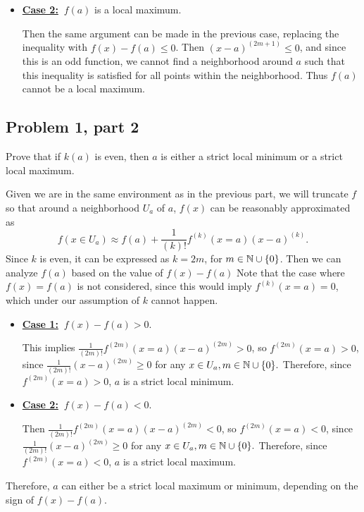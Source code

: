 \begin{solution}
\begin{itemize}[-]
        \item \underline{\textbf{Case 2:}} $ \ f(a)$ is a local maximum.

        \hop
        Then the same argument can be made in the previous case, replacing the inequality with $f(x) - f(a) \leq 0$. Then $(x - a)^{(2m+1)} \leq 0$, and since this is an odd function, we cannot find a neighborhood around $a$ such that this inequality is satisfied for all points within the neighborhood. Thus $f(a)$ cannot be a local maximum.
    \end{itemize}
\end{solution}

\newpage
\subsection{Problem 1, part 2}
Prove that if $k(a)$ is even, then $a$ is either a strict local minimum or a strict local maximum.  
\partbreak
\begin{solution}

    Given we are in the same environment as in the previous part, we will truncate $f$ so that around a neighborhood $U_a$ of $a$, $f(x)$ can be reasonably approximated as 
    \[f(x \in U_a) \approx f(a) + \frac{1}{(k)!}f^{(k)}(x = a) (x - a)^{(k)}.\]
    Since $k$ is even, it can be expressed as $k = 2m$, for $m \in \mathbb{N} \cup \{0\}$. Then we can analyze $f(a)$ based on the value of $f(x) - f(a)$ Note that the case where $f(x) = f(a)$ is not considered, since this would imply $f^{(k)}(x = a) = 0$, which under our assumption of $k$ cannot happen.

    \begin{itemize}[-]
        \item \underline{\textbf{Case 1:}} $ \ f(x) - f(a) > 0 $. 

        \hop
         This implies $\frac{1}{(2m)!}f^{(2m)}(x = a) (x - a)^{(2m)} > 0$, so $f^{(2m)}(x = a) > 0$, since $\frac{1}{(2m)!}(x - a)^{(2m)} \geq 0$ for any $x \in U_a, m \in \mathbb{N} \cup \{0\}.$ Therefore, since $f^{(2m)}(x = a) > 0$, $a$ is a strict local minimum. 

         \item \underline{\textbf{Case 2:}} $ \ f(x) - f(a) < 0$.

         \hop
         Then $\frac{1}{(2m)!}f^{(2m)}(x = a) (x - a)^{(2m)} < 0$, so $f^{(2m)}(x = a) < 0$, since $\frac{1}{(2m)!}(x - a)^{(2m)} \geq 0$ for any $x \in U_a, m \in \mathbb{N} \cup \{0\}.$ Therefore, since $f^{(2m)}(x = a) < 0$, $a$ is a strict local maximum. 
    \end{itemize}

    Therefore, $a$ can either be a strict local maximum or minimum, depending on the sign of $f(x) - f(a)$.  
\end{solution}

